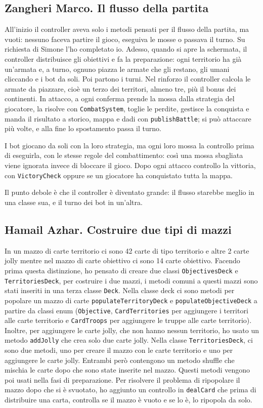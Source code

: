 \documentclass[a4paper,12pt]{report}
\begin{document}
\subsection{Zangheri Marco. Il flusso della partita}
All'inizio il controller aveva solo i metodi pensati per il flusso della partita, ma vuoti: nessuno faceva partire il gioco, eseguiva le mosse o passava il turno. Su richiesta di Simone l'ho completato io. Adesso, quando si apre la schermata, il controller distribuisce gli obiettivi e fa la preparazione: ogni territorio ha già un'armata e, a turno, ognuno piazza le armate che gli restano, gli umani cliccando e i bot da soli. Poi partono i turni. Nel rinforzo il controller calcola le armate da piazzare, cioè un terzo dei territori, almeno tre, più il bonus dei continenti. In attacco, a ogni conferma prende la mossa dalla strategia del giocatore, la risolve con \texttt{CombatSystem}, toglie le perdite, gestisce la conquista e manda il risultato a storico, mappa e dadi con \texttt{publishBattle}; si può attaccare più volte, e alla fine lo spostamento passa il turno.

I bot giocano da soli con la loro strategia, ma ogni loro mossa la controllo prima di eseguirla, con le stesse regole del combattimento: così una mossa sbagliata viene ignorata invece di bloccare il gioco. Dopo ogni attacco controllo la vittoria, con \texttt{VictoryCheck} oppure se un giocatore ha conquistato tutta la mappa.

Il punto debole è che il controller è diventato grande: il flusso starebbe meglio in una classe sua, e il turno dei bot in un'altra.

\subsection{Hamail Azhar. Costruire due tipi di mazzi}
In un mazzo di carte territorio ci sono 42 carte di tipo territorio e altre 2 carte jolly mentre nel mazzo di carte obiettivo ci sono 14 carte obiettivo. Facendo prima questa distinzione, ho pensato di creare due classi \texttt{ObjectivesDeck} e \texttt{TerritoriesDeck}, per costruire i due mazzi, i metodi comuni a questi mazzi sono stati inseriti in una terza classe \texttt{Deck}. Nella classe deck ci sono metodi per popolare un mazzo di carte \texttt{populateTerritoryDeck} e \texttt{populateObjectiveDeck} a partire da classi enum (\texttt{Objective}, \texttt{CardTerritories} per aggiungere i territori alle carte territorio e \texttt{CardTroops} per aggiungere le truppe alle carte territorio). Inoltre, per aggiungere le carte jolly, che non hanno nessun territorio, ho usato un metodo \texttt{addJolly} che crea solo due carte jolly. Nella classe \texttt{TerritoriesDeck}, ci sono due metodi, uno per creare il mazzo con le carte territorio e uno per aggiungere le carte jolly. Entrambi però contengono un metodo shuffle che mischia le carte dopo che sono state inserite nel mazzo. Questi metodi vengono poi usati nella fasi di preparazione. Per risolvere il problema di ripopolare il mazzo dopo che si è svuotato, ho aggiunto un controllo in \texttt{dealCard} che prima di distribuire una carta, controlla se il mazzo è vuoto e se lo è, lo ripopola da solo.
\end{document}
